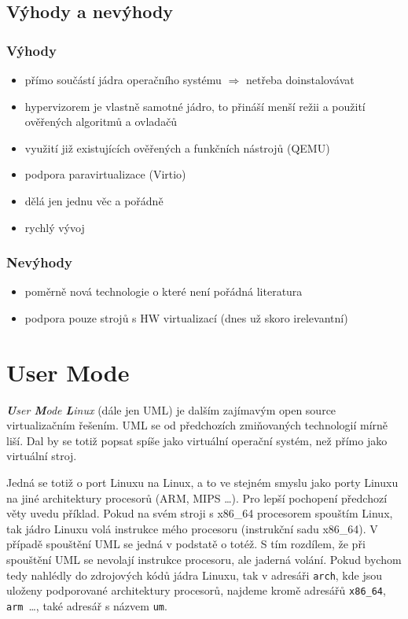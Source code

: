\subsection{Výhody a nevýhody}
\subsubsection{Výhody}
\begin{itemize}
  \item přímo součástí jádra operačního systému $\Rightarrow$ netřeba doinstalovávat
  \item hypervizorem je vlastně samotné jádro, to přináší menší režii a použití ověřených algoritmů a ovladačů
  \item využití již existujících ověřených a funkčních nástrojů (QEMU)
  \item podpora paravirtualizace (Virtio)
  \item dělá jen jednu věc a pořádně
  \item rychlý vývoj
\end{itemize}
\subsubsection{Nevýhody}
\begin{itemize}
  \item poměrně nová technologie o které není pořádná literatura
  \item podpora pouze strojů s HW virtualizací (dnes už skoro irelevantní)
\end{itemize}
\section{User Mode \linux}
\emph{\textbf{U}ser \textbf{M}ode \textbf{L}inux} (dále jen UML) je dalším zajímavým open source virtualizačním řešením. UML se od předchozích zmiňovaných technologií mírně liší. Dal by se totiž popsat spíše jako virtuální operační systém, než přímo jako virtuální stroj.

Jedná se totiž o port Linuxu na Linux, a to ve stejném smyslu jako porty Linuxu na jiné architektury procesorů (ARM, MIPS \dots). Pro lepší pochopení předchozí věty uvedu příklad. Pokud na svém stroji s x86\_64 procesorem spouštím Linux, tak jádro Linuxu volá instrukce mého procesoru (instrukční sadu x86\_64). V případě spouštění UML se jedná v podstatě o totéž. S tím rozdílem, že při spouštění UML se nevolají instrukce procesoru, ale jaderná volání. Pokud bychom tedy nahlédly do zdrojových kódů jádra Linuxu, tak v adresáři \texttt{arch}, kde jsou uloženy podporované architektury procesorů, najdeme kromě adresářů \texttt{x86\_64}, \texttt{arm}~\dots, také adresář s názvem \texttt{um}.

